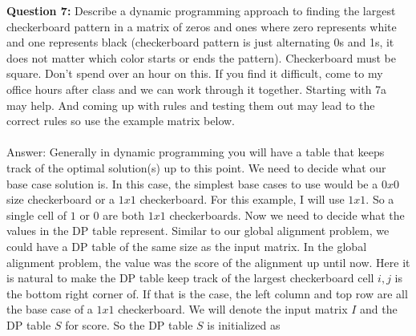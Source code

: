 \documentclass{article}\usepackage[]{graphicx}\usepackage[]{color}
\begin{document}
\textbf{Question 7:} Describe a dynamic programming approach to finding the largest checkerboard pattern in a matrix of zeros and ones where zero represents white and one represents black (checkerboard pattern is just alternating 0s and 1s, it does not matter which color starts or ends the pattern). Checkerboard must be square. Don't spend over an hour on this. If you find it difficult, come to my office hours after class and we can work through it together. Starting with 7a may help. And coming up with rules and testing them out may lead to the correct rules so use the example matrix below. \\ \\
Answer: 
\noindent
Generally in dynamic programming you will have a table that keeps track of the optimal solution(s) up to this point. We need to decide what our base case solution is. In this case, the simplest base cases to use would be a $0x0$ size checkerboard or a $1x1$ checkerboard. For this example, I will use $1x1$. So a single cell of $1$ or $0$ are both $1x1$ checkerboards. Now we need to decide what the values in the DP table represent. Similar to our global alignment problem, we could have a DP table of the same size as the input matrix. In the global alignment problem, the value was the score of the alignment up until now. Here it is natural to make the DP table keep track of the largest checkerboard cell $i,j$ is the bottom right corner of. If that is the case, the left column and top row are all the base case of a $1x1$ checkerboard. We will denote the input matrix $I$ and the DP table $S$ for score. So the DP table $S$ is initialized as
\noindent
{}
\end{document}
